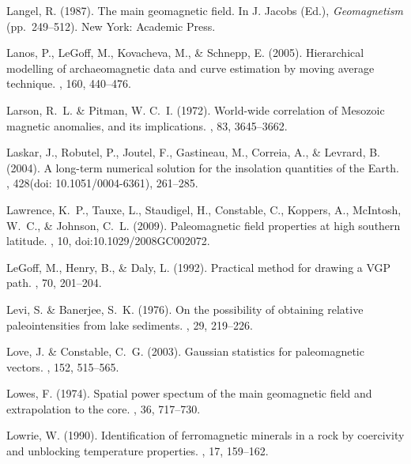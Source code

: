\documentclass[11pt]{book}
\begin{document}
\begin{thebibliography}{}
Langel, R. (1987).
\newblock The main geomagnetic field.
\newblock In J. Jacobs (Ed.), {\em Geomagnetism}  (pp.\ 249--512). New York:
  Academic Press.

Lanos, P., LeGoff, M., Kovacheva, M., \& Schnepp, E. (2005).
\newblock Hierarchical modelling of archaeomagnetic data and curve estimation
  by moving average technique.
, 160, 440--476.

Larson, R.~L. \& Pitman, W. C.~I. (1972).
\newblock World-wide correlation of Mesozoic magnetic anomalies, and its
  implications.
, 83, 3645--3662.

Laskar, J., Robutel, P., Joutel, F., Gastineau, M., Correia, A., \& Levrard, B.
  (2004).
\newblock A long-term numerical solution for the insolation quantities of the
  Earth.
, 428(doi: 10.1051/0004-6361), 261--285.

Lawrence, K.~P., Tauxe, L., Staudigel, H., Constable, C., Koppers, A.,
  McIntosh, W.~C., \& Johnson, C.~L. (2009).
\newblock Paleomagnetic field properties at high southern latitude.
, 10, doi:10.1029/2008GC002072.

LeGoff, M., Henry, B., \& Daly, L. (1992).
\newblock Practical method for drawing a VGP path.
, 70, 201--204.

Levi, S. \& Banerjee, S.~K. (1976).
\newblock On the possibility of obtaining relative paleointensities from lake
  sediments.
, 29, 219--226.

Love, J. \& Constable, C.~G. (2003).
\newblock Gaussian statistics for paleomagnetic vectors.
, 152, 515--565.

Lowes, F. (1974).
\newblock Spatial power spectum of the main geomagnetic field and extrapolation
  to the core.
, 36, 717--730.

Lowrie, W. (1990).
\newblock Identification of ferromagnetic minerals in a rock by coercivity and
  unblocking temperature properties.
, 17, 159--162.


\end{thebibliography}
\end{document}
